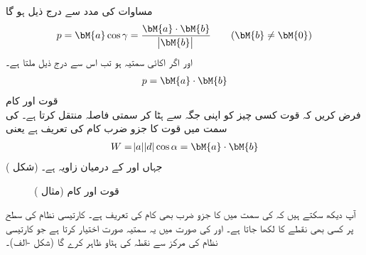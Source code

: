 مساوات  کی مدد سے درج ذیل ہو گا
\begin{align}\label{مساوات_الجبرا_عمودی_سایہ_الف}
p=\bM{a}\cos \gamma=\frac{\bM{a}\cdot\bM{b}}{\abs{\bM{b}}} \quad \quad (\bM{b}\ne \bM{0})
\end{align}
اور اگر  اکائی سمتیہ ہو تب اس سے درج ذیل ملتا ہے۔
\begin{align}\label{مساوات_الجبرا_عمودی_سایہ_ب}
p=\bM{a}\cdot\bM{b}
\end{align}
\quad قوت اور کام\\
فرض کریں کہ قوت  کسی چیز کو اپنی جگہ سے ہٹا کر سمتی فاصلہ  منتقل کرتا ہے۔ کی سمت میں قوت کا جزو ضرب  کام  کی تعریف ہے یعنی
\begin{align}
W=\abs{a}\abs{d}\cos \alpha=\bM{a}\cdot \bM{b}
\end{align} 
جہاں  اور  کے درمیان زاویہ  ہے۔ (شکل )
\begin{figure}
\centering
{}
\caption{قوت اور کام (مثال )}
\label{شکل_مثال_الجبرا_قوت_کام}
\end{figure}

آپ دیکھ سکتے ہیں کہ  کی سمت میں  کا جزو ضرب  بھی کام کی تعریف ہے۔
کارتیسی نظام کی  سطح پر  کسی بھی نقطے کا     لکھا جاتا ہے۔ اور  کی صورت میں یہ سمتیہ  صورت اختیار کرتا ہے جو کارتیسی نظام کی مرکز سے نقطہ  کی ہٹاو ظاہر کرے گا (شکل -الف)۔

